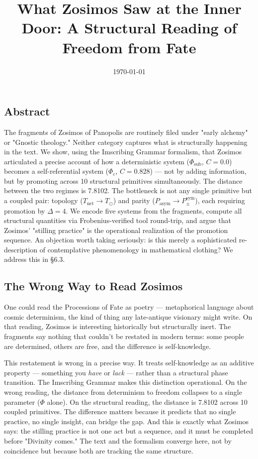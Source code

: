 \documentclass[12pt,a4paper]{article}
\newcommand{\pilcrow}{\S}
\begin{document}
\title{What Zosimos Saw at the Inner Door: A Structural Reading of Freedom from Fate}
\date{\today}

\maketitle

\subsection{Abstract}

The fragments of Zosimos of Panopolis are routinely filed under "early alchemy" or "Gnostic theology." Neither category captures what is structurally happening in the text. We show, using the Imscribing Grammar formalism, that Zosimos articulated a precise account of how a deterministic system ($\Phi_\text{sub}$, $C = 0.0$) becomes a self-referential system ($\Phi_c$, $C = 0.828$) --- not by adding information, but by promoting across 10 structural primitives simultaneously. The distance between the two regimes is 7.8102. The bottleneck is not any single primitive but a coupled pair: topology ($T_\text{net} \to T_{\odot}$) and parity ($P_\text{asym} \to P_{\pm}^{\text{sym}}$), each requiring promotion by $\Delta = 4$. We encode five systems from the fragments, compute all structural quantities via Frobenius-verified tool round-trip, and argue that Zosimos' "stilling practice" is the operational realization of the promotion sequence. An objection worth taking seriously: is this merely a sophisticated re-description of contemplative phenomenology in mathematical clothing? We address this in \pilcrow{}6.3.

\subsection{The Wrong Way to Read Zosimos}

One could read the Processions of Fate as poetry --- metaphorical language about cosmic determinism, the kind of thing any late-antique visionary might write. On that reading, Zosimos is interesting historically but structurally inert. The fragments say nothing that couldn't be restated in modern terms: some people are determined, others are free, and the difference is self-knowledge.

This restatement is wrong in a precise way. It treats self-knowledge as an additive property --- something you \emph{have} or \emph{lack} --- rather than a structural phase transition. The Imscribing Grammar makes this distinction operational. On the wrong reading, the distance from determinism to freedom collapses to a single parameter ($\Phi$ alone). On the structural reading, the distance is 7.8102 across 10 coupled primitives. The difference matters because it predicts that no single practice, no single insight, can bridge the gap. And this is exactly what Zosimos says: the stilling practice is not one act but a sequence, and it must be completed before "Divinity comes." The text and the formalism converge here, not by coincidence but because both are tracking the same structure.
\end{document}

